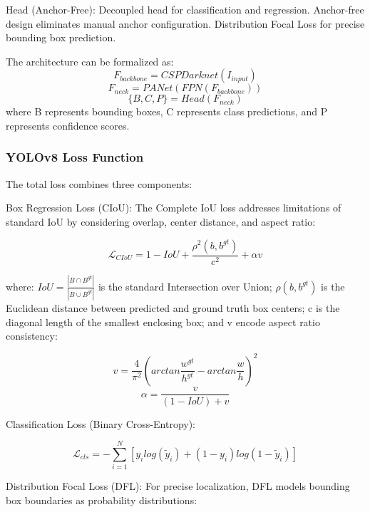 \documentclass[runningheads]{llncs}
\begin{document}
\noindent Head (Anchor-Free): Decoupled head for classification and regression. Anchor-free design eliminates manual anchor configuration. Distribution Focal Loss for precise bounding box prediction.

The architecture can be formalized as:
\begin{equation}
F_{backbone}=CSPDarknet(I_{input})
\end{equation}
\begin{equation}
F_{neck}=PANet(FPN(F_{backbone}))
\end{equation}
\begin{equation}
\{B,C,P\}=Head(F_{neck})
\end{equation}
where B represents bounding boxes, C represents class predictions, and P represents confidence scores.

\subsubsection{YOLOv8 Loss Function}
The total loss combines three components:

\noindent Box Regression Loss (CIoU): The Complete IoU loss addresses limitations of standard IoU by considering overlap, center distance, and aspect ratio:

\begin{equation}
\mathcal{L}_{CIoU}=1-IoU+\frac{\rho^{2}(b,b^{gt})}{c^{2}}+\alpha v
\end{equation}

where: $IoU=\frac{|B \cap B^{gt}|}{|B \cup B^{gt}|}$ is the standard Intersection over Union; $\rho(b,b^{gt})$ is the Euclidean distance between predicted and ground truth box centers; c is the diagonal length of the smallest enclosing box; and v encode aspect ratio consistency:

\begin{equation}
v=\frac{4}{\pi^{2}}(arctan\frac{w^{gt}}{h^{gt}}-arctan\frac{w}{h})^{2}
\end{equation}
\begin{equation}
\alpha=\frac{v}{(1-IoU)+v}
\end{equation}

\noindent Classification Loss (Binary Cross-Entropy):

\begin{equation}
\mathcal{L}_{cls}=-\sum_{i=1}^{N}[y_{i}log(\tilde{y}_{i})+(1-y_{i})log(1-\tilde{y}_{i})]
\end{equation}

\noindent Distribution Focal Loss (DFL): For precise localization, DFL models bounding box boundaries as probability distributions:
\end{document}
